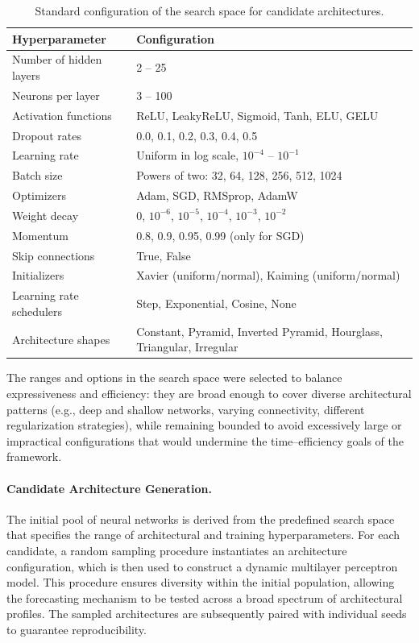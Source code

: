 \begin{table}[H]
\centering
\caption{Standard configuration of the search space for candidate architectures.}
\label{tab:search_space}
\begin{tabular}{p{5cm} p{10cm}}
\hline
\textbf{Hyperparameter} & \textbf{Configuration} \\
\hline
Number of hidden layers & 2 -- 25 \\
Neurons per layer & 3 -- 100 \\
Activation functions & ReLU, LeakyReLU, Sigmoid, Tanh, ELU, GELU \\
Dropout rates & 0.0, 0.1, 0.2, 0.3, 0.4, 0.5 \\
Learning rate & Uniform in log scale, $10^{-4}$ -- $10^{-1}$ \\
Batch size & Powers of two: 32, 64, 128, 256, 512, 1024 \\
Optimizers & Adam, SGD, RMSprop, AdamW \\
Weight decay & 0, $10^{-6}$, $10^{-5}$, $10^{-4}$, $10^{-3}$, $10^{-2}$ \\
Momentum & 0.8, 0.9, 0.95, 0.99 (only for SGD) \\
Skip connections & True, False \\
Initializers & Xavier (uniform/normal), Kaiming (uniform/normal) \\
Learning rate schedulers & Step, Exponential, Cosine, None \\
Architecture shapes & Constant, Pyramid, Inverted Pyramid, Hourglass, Triangular, Irregular \\
\hline
\end{tabular}
\end{table}

The ranges and options in the search space were selected to balance expressiveness and efficiency: they are broad enough to cover diverse architectural patterns (e.g., deep and shallow networks, varying connectivity, different regularization strategies), while remaining bounded to avoid excessively large or impractical configurations that would undermine the time--efficiency goals of the framework.


\paragraph{Candidate Architecture Generation.}
The initial pool of neural networks is derived from the predefined search space that specifies the range of architectural and training hyperparameters. For each candidate, a random sampling procedure instantiates an architecture configuration, which is then used to construct a dynamic multilayer perceptron model. This procedure ensures diversity within the initial population, allowing the forecasting mechanism to be tested across a broad spectrum of architectural profiles. The sampled architectures are subsequently paired with individual seeds to guarantee reproducibility.

